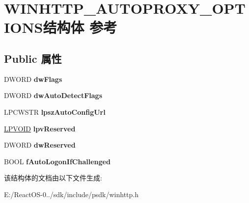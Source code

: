 \hypertarget{struct_w_i_n_h_t_t_p___a_u_t_o_p_r_o_x_y___o_p_t_i_o_n_s}{}\section{W\+I\+N\+H\+T\+T\+P\+\_\+\+A\+U\+T\+O\+P\+R\+O\+X\+Y\+\_\+\+O\+P\+T\+I\+O\+N\+S结构体 参考}
\label{struct_w_i_n_h_t_t_p___a_u_t_o_p_r_o_x_y___o_p_t_i_o_n_s}
\subsection*{Public 属性}
\begin{DoxyCompactItemize}
\item 
\mbox{\label{struct_w_i_n_h_t_t_p___a_u_t_o_p_r_o_x_y___o_p_t_i_o_n_s_a0944e6651c69da0498ce87a0fe8eb25c}} 
D\+W\+O\+RD {\bfseries dw\+Flags}
\item 
\mbox{\label{struct_w_i_n_h_t_t_p___a_u_t_o_p_r_o_x_y___o_p_t_i_o_n_s_ab2628d8791b96cf5338acd692dc98e87}} 
D\+W\+O\+RD {\bfseries dw\+Auto\+Detect\+Flags}
\item 
\mbox{\label{struct_w_i_n_h_t_t_p___a_u_t_o_p_r_o_x_y___o_p_t_i_o_n_s_a4194788019cc3d0420005fe556377390}} 
L\+P\+C\+W\+S\+TR {\bfseries lpsz\+Auto\+Config\+Url}
\item 
\mbox{\label{struct_w_i_n_h_t_t_p___a_u_t_o_p_r_o_x_y___o_p_t_i_o_n_s_a41eaf7b5257c6f10cffe8b80df92ca68}} 
\hyperlink{interfacevoid}{L\+P\+V\+O\+ID} {\bfseries lpv\+Reserved}
\item 
\mbox{\label{struct_w_i_n_h_t_t_p___a_u_t_o_p_r_o_x_y___o_p_t_i_o_n_s_acec23b91cf856c97d69e5f049ac2b46a}} 
D\+W\+O\+RD {\bfseries dw\+Reserved}
\item 
\mbox{\label{struct_w_i_n_h_t_t_p___a_u_t_o_p_r_o_x_y___o_p_t_i_o_n_s_a0621187b41ec3901f808f2251b2d4920}} 
B\+O\+OL {\bfseries f\+Auto\+Logon\+If\+Challenged}
\end{DoxyCompactItemize}


该结构体的文档由以下文件生成\+:\begin{DoxyCompactItemize}
\item 
E\+:/\+React\+O\+S-\/0../sdk/include/psdk/winhttp.\+h\end{DoxyCompactItemize}
